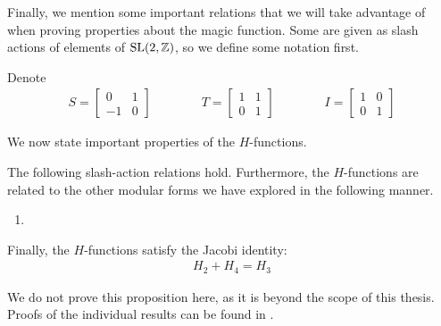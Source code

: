 Finally, we mention some important relations that we will take advantage of when proving properties about the magic function. Some are given as slash actions of elements of $\operatorname{SL}\!\left( 2, \mathbb{Z} \right)$, so we define some notation first.

\begin{boxnotation}
    Denote
    \begin{align*}
        S = \begin{bmatrix}
            0 & 1 \\ -1 & 0
        \end{bmatrix}
        \qquad \qquad
        T = \begin{bmatrix}
            1 & 1 \\ 0 & 1
        \end{bmatrix}
        \qquad \qquad
        I = \begin{bmatrix}
            1 & 0 \\ 0 & 1
        \end{bmatrix}
    \end{align*}
\end{boxnotation}

We now state important properties of the $H$-functions.

\begin{boxproposition}\label{Ch2:Prop:H_Rels}
    The following slash-action relations hold.
    Furthermore, the $H$-functions are related to the other modular forms we have explored in the following manner.
    \begin{enumerate}
        \item 
    \end{enumerate}
    Finally, the $H$-functions satisfy the Jacobi identity:
    \begin{align*}
        H_2 + H_4 = H_3
    \end{align*}
\end{boxproposition}

We do not prove this proposition here, as it is beyond the scope of this thesis. Proofs of the individual results can be found in \cite{blueprint}.

